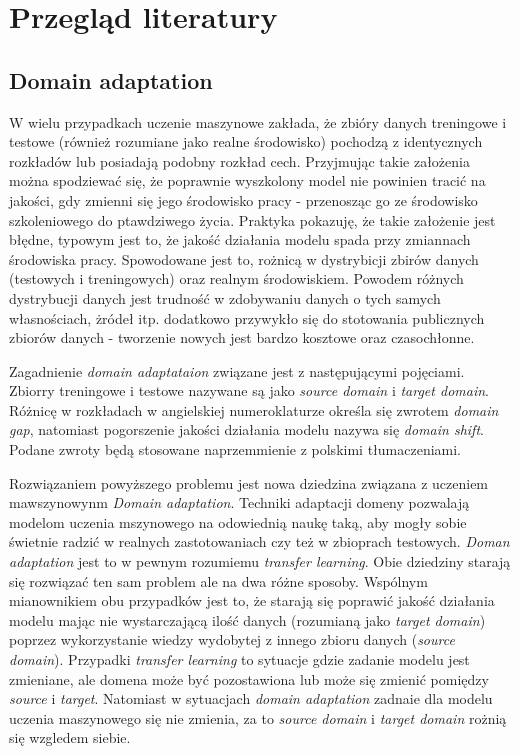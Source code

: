 
\chapter{Przegląd literatury}
    \justify    
    \section{Domain adaptation}
         W wielu przypadkach uczenie maszynowe zakłada, że zbióry danych treningowe i testowe (również rozumiane jako realne środowisko) pochodzą z identycznych rozkładów lub posiadają podobny rozkład cech. Przyjmując takie założenia można spodziewać się, że poprawnie wyszkolony model nie powinien tracić na jakości, gdy zmienni się jego środowisko pracy - przenosząc go ze środowisko szkoleniowego do ptawdziwego życia. Praktyka pokazuję, że takie założenie jest błędne, typowym jest to, że jakość działania modelu spada przy zmiannach środowiska pracy. Spowodowane jest to, rożnicą w dystrybicji zbirów danych (testowych i treningowych) oraz realnym środowiskiem. Powodem różnych dystrybucji danych jest trudność w zdobywaniu danych o tych samych własnościach, żródeł itp. dodatkowo przywykło się do stotowania publicznych zbiorów danych - tworzenie nowych jest bardzo kosztowe oraz czasochłonne\cite{domain_adaptation_review}.
        \par
        Zagadnienie \textit{domain adaptataion} związane jest z następującymi pojęciami. Zbiorry treningowe i testowe nazywane są jako \textit{source domain} i \textit{target domain}. Różnicę w rozkładach w angielskiej numeroklaturze określa się zwrotem \textit{domain gap}, natomiast pogorszenie jakości działania modelu nazywa się \textit{domain shift}. Podane zwroty będą stosowane naprzemmienie z polskimi tłumaczeniami. 
        \par  
        Rozwiązaniem powyższego problemu jest nowa dziedzina związana z uczeniem mawszynowynm \textit{Domain adaptation}. Techniki adaptacji domeny pozwalają modelom uczenia mszynowego na odowiednią naukę taką, aby mogły sobie świetnie radzić w realnych zastotowaniach czy też w zbioprach testowych. \textit{Doman adaptation} jest to w pewnym rozumiemu \textit{transfer learning}\cite{transfer_learning}. Obie dziedziny starają się
        rozwiązać ten sam problem ale na dwa różne sposoby. Wspólnym mianownikiem obu przypadków jest to, że starają się poprawić jakość działania modelu mając nie wystarczającą ilość danych (rozumianą jako \textit{target domain}) poprzez wykorzystanie wiedzy wydobytej z innego zbioru danych (\textit{source domain}). Przypadki \textit{transfer learning} to sytuacje gdzie zadanie modelu jest zmieniane, ale domena może być pozostawiona lub może się zmienić pomiędzy \textit{source} i \textit{target}. Natomiast w sytuacjach \textit{domain adaptation} zadnaie dla modelu uczenia maszynowego się nie zmienia, za to \textit{source domain} i \textit{target domain} rożnią się wzgledem siebie.
